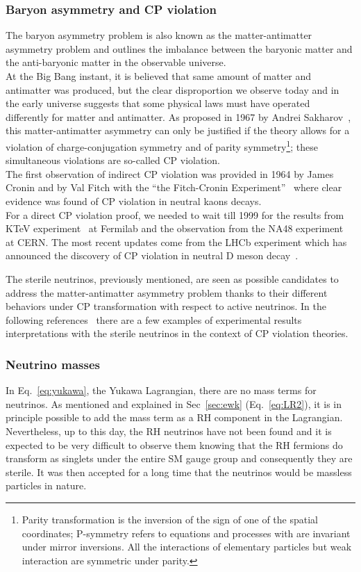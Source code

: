 \subsubsection{Baryon asymmetry and CP violation}
The baryon asymmetry problem is also known as the matter-antimatter asymmetry problem and outlines the imbalance between the baryonic matter and the anti-baryonic matter in the observable universe.\\
 At the Big Bang instant, it is believed that same amount of matter and antimatter was produced, but the clear disproportion we observe today and in the early universe suggests that some physical laws must have operated differently for matter and antimatter. As proposed in 1967 by Andrei Sakharov~\cite{Sakharov:1967dj}, this matter-antimatter asymmetry can only be justified if the theory allows for a violation of charge-conjugation symmetry and of parity symmetry\footnote{Parity transformation is the inversion of the sign of one of the spatial coordinates; P-symmetry refers to equations and processes with are invariant under mirror inversions. All the interactions of elementary particles but weak interaction are symmetric under parity.}; these simultaneous violations are so-called CP violation. \\
The first observation of indirect CP violation was provided in 1964 by James Cronin and by Val Fitch with the ``the Fitch-Cronin Experiment''~\cite{PhysRevLett.13.138} where clear evidence was found of CP violation in neutral kaons decays.\\
For a direct CP violation proof, we needed to wait till 1999 for the results from KTeV experiment~\cite{Alavi_Harati_1999} at Fermilab and the observation from the NA48 experiment~\cite{Fanti_1999} at CERN. The most recent updates come from the LHCb experiment which has announced the discovery of CP violation in neutral D meson decay~\cite{PhysRevLett.122.211803}.

The sterile neutrinos, previously mentioned, are seen as possible candidates to address the matter-antimatter asymmetry problem thanks to their different behaviors under CP transformation with respect to active neutrinos. In the following references~\cite{Gandhi_2015,Klop_2015,Palazzo_2020}  there are a few examples of experimental results interpretations with the sterile neutrinos in the context of CP violation theories.

\subsubsection{Neutrino masses}
In Eq.~\ref{eq:yukawa}, the Yukawa Lagrangian, there are no mass terms for neutrinos. As mentioned and explained in Sec~\ref{sec:ewk} (Eq.~\ref{eq:LR2}), it is in principle possible to add the mass term as a RH component in the Lagrangian. Nevertheless, up to this day, the RH neutrinos have not been found and it is expected to be very difficult to observe them knowing that the RH fermions do transform as singlets under the entire SM gauge group and consequently they are sterile. It was then accepted for a long time that the neutrinos would be massless particles in nature.

